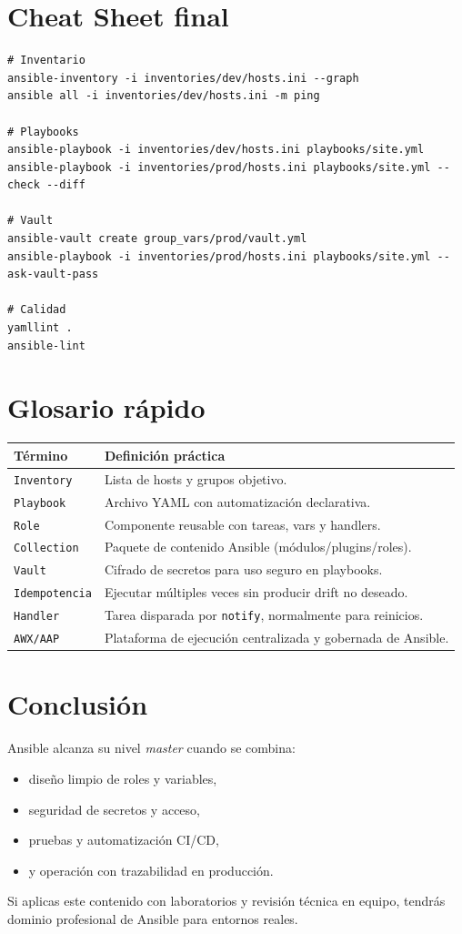 \documentclass[12pt,a4paper]{article}
\begin{document}
\section{Cheat Sheet final}

\begin{lstlisting}[caption=Comandos que debes dominar]
# Inventario
ansible-inventory -i inventories/dev/hosts.ini --graph
ansible all -i inventories/dev/hosts.ini -m ping

# Playbooks
ansible-playbook -i inventories/dev/hosts.ini playbooks/site.yml
ansible-playbook -i inventories/prod/hosts.ini playbooks/site.yml --check --diff

# Vault
ansible-vault create group_vars/prod/vault.yml
ansible-playbook -i inventories/prod/hosts.ini playbooks/site.yml --ask-vault-pass

# Calidad
yamllint .
ansible-lint
\end{lstlisting}

\section{Glosario rápido}

\begin{longtable}{p{} p{}}
\toprule
\textbf{Término} & \textbf{Definición práctica} \\
\midrule
\texttt{Inventory} & Lista de hosts y grupos objetivo. \\
\texttt{Playbook} & Archivo YAML con automatización declarativa. \\
\texttt{Role} & Componente reusable con tareas, vars y handlers. \\
\texttt{Collection} & Paquete de contenido Ansible (módulos/plugins/roles). \\
\texttt{Vault} & Cifrado de secretos para uso seguro en playbooks. \\
\texttt{Idempotencia} & Ejecutar múltiples veces sin producir drift no deseado. \\
\texttt{Handler} & Tarea disparada por \texttt{notify}, normalmente para reinicios. \\
\texttt{AWX/AAP} & Plataforma de ejecución centralizada y gobernada de Ansible. \\
\bottomrule
\end{longtable}

\section{Conclusión}

Ansible alcanza su nivel \textit{master} cuando se combina:
\begin{itemize}
  \item diseño limpio de roles y variables,
  \item seguridad de secretos y acceso,
  \item pruebas y automatización CI/CD,
  \item y operación con trazabilidad en producción.
\end{itemize}

Si aplicas este contenido con laboratorios y revisión técnica en equipo, tendrás dominio profesional de Ansible para entornos reales.
\end{document}

